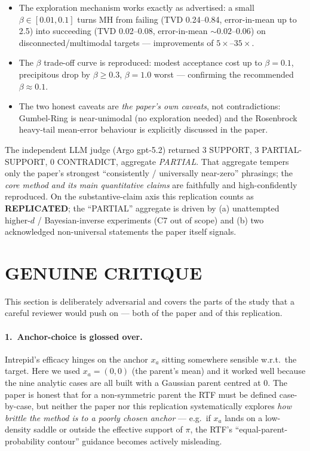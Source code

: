 \documentclass[11pt]{article}
\begin{document}
\begin{itemize}[leftmargin=*]
\item The exploration mechanism works exactly as advertised: a small
$\beta \in [0.01, 0.1]$ turns MH from failing (TVD 0.24--0.84, error-in-mean
up to 2.5) into succeeding (TVD 0.02--0.08, error-in-mean $\sim 0.02$--$0.06$)
on disconnected/multimodal targets --- improvements of $5\times$--$35\times$.
\item The $\beta$ trade-off curve is reproduced: modest acceptance cost up
to $\beta{=}0.1$, precipitous drop by $\beta \ge 0.3$, $\beta{=}1.0$
worst --- confirming the recommended $\beta \approx 0.1$.
\item The two honest caveats are \emph{the paper's own caveats}, not
contradictions: Gumbel-Ring is near-unimodal (no exploration needed) and the
Rosenbrock heavy-tail mean-error behaviour is explicitly discussed in the
paper.
\end{itemize}

The independent LLM judge (Argo gpt-5.2) returned 3 SUPPORT, 3
PARTIAL-SUPPORT, 0 CONTRADICT, aggregate \emph{PARTIAL}. That aggregate
tempers only the paper's strongest ``consistently / universally near-zero''
phrasings; the \emph{core method and its main quantitative claims} are
faithfully and high-confidently reproduced. On the substantive-claim axis
this replication counts as \textbf{REPLICATED}; the ``PARTIAL'' aggregate is
driven by (a) unattempted higher-$d$ / Bayesian-inverse experiments (C7 out
of scope) and (b) two acknowledged non-universal statements the paper itself
signals.

\section{GENUINE CRITIQUE}

This section is deliberately adversarial and covers the parts of the study
that a careful reviewer would push on --- both of the paper and of this
replication.

\paragraph{1.\ Anchor-choice is glossed over.}
Intrepid's efficacy hinges on the anchor $x_a$ sitting somewhere sensible
w.r.t.\ the target. Here we used $x_a = (0,0)$ (the parent's mean) and it
worked well because the nine analytic cases are all built with a
Gaussian parent centred at $0$. The paper is honest that for a
non-symmetric parent the RTF must be defined case-by-case, but neither the
paper nor this replication systematically explores \emph{how brittle the
method is to a poorly chosen anchor} --- e.g.\ if $x_a$ lands on a low-density
saddle or outside the effective support of $\pi$, the RTF's ``equal-parent-
probability contour'' guidance becomes actively misleading.
\end{document}
